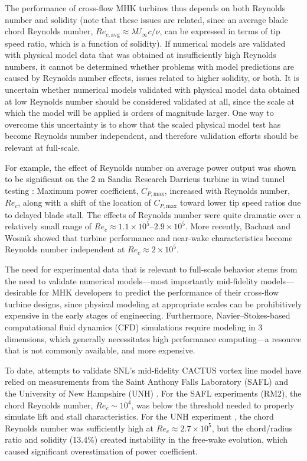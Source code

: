 \documentclass[12pt,letterpaper]{scrreprt}
\begin{document}
The performance of cross-flow MHK turbines thus depends on both Reynolds number
and solidity (note that these issues are related, since an average blade chord
Reynolds number, $Re_{c,\mathrm{avg}} \approx \lambda U_\infty c/ \nu$, can be
expressed in terms of tip speed ratio, which is a function of solidity). If
numerical models are validated with physical model data that was obtained at
insufficiently high Reynolds numbers, it cannot be determined whether problems
with model predictions are caused by Reynolds number effects, issues related to
higher solidity, or both. It is uncertain whether numerical models validated
with physical model data obtained at low Reynolds number should be considered
validated at all, since the scale at which the model will be applied is orders
of magnitude larger. One way to overcome this uncertainty is to show that the
scaled physical model test has become Reynolds number independent, and therefore
validation efforts should be relevant at full-scale. 

For example, the effect of Reynolds number on average power output was shown to
be significant on the 2 m Sandia Research Darrieus turbine in wind tunnel
testing \cite{Blackwell1976}: Maximum power coefficient, $C_{P,\mathrm{max}}$,
increased with Reynolds number, $Re_c$, along with a shift of the location of
$C_{P,\mathrm{max}}$ toward lower tip speed ratios due to delayed blade stall.
The effects of Reynolds number were quite dramatic over a relatively small range
of $Re_c \approx 1.1 \times 10^5$--$2.9 \times 10^5$. More recently, Bachant and
Wosnik \cite{Bachant2014} showed that turbine performance and near-wake
characteristics become Reynolds number independent at $Re_c \approx 2 \times
10^5$.

The need for experimental data that is relevant to full-scale behavior stems
from the need to validate numerical models---most importantly mid-fidelity
models---desirable for MHK developers to predict the performance of their
cross-flow turbine designs, since physical modeling at appropriate scales can be
prohibitively expensive in the early stages of engineering. Furthermore,
Navier--Stokes-based computational fluid dynamics (CFD) simulations require
modeling in 3 dimensions, which generally necessitates high performance
computing---a resource that is not commonly available, and more expensive.

To date, attempts to validate SNL's mid-fidelity CACTUS vortex line model
\cite{Murray2011} have relied on measurements from the Saint Anthony Falls
Laboratory (SAFL) \cite{Hill2014} and the University of New Hampshire (UNH)
\cite{Neary2013, Michelen2014}. For the SAFL experiments (RM2), the chord
Reynolds number, $Re_c \sim 10^4$, was below the threshold needed to properly
simulate lift and stall characteristics. For the UNH experiment
\cite{Bachant2013}, the chord Reynolds number was sufficiently high at $Re_c
\approx 2.7 \times 10^5$, but the chord/radius ratio and solidity (13.4\%)
created instability in the free-wake evolution, which caused significant
overestimation of power coefficient.
\end{document}
